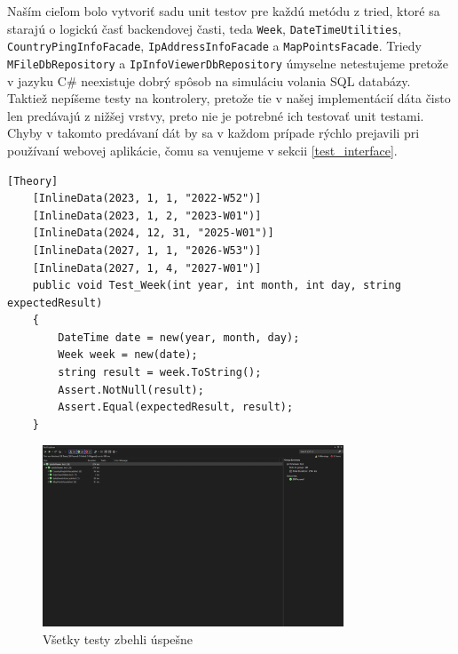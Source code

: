Naším cieľom bolo vytvoriť sadu unit testov pre každú metódu z tried, ktoré sa starajú o logickú časť backendovej časti, teda \lstinline{Week}, 
\lstinline{DateTimeUtilities}, \lstinline{CountryPingInfoFacade}, \lstinline{IpAddressInfoFacade} a \lstinline{MapPointsFacade}.
Triedy \lstinline{MFileDbRepository} a \lstinline{IpInfoViewerDbRepository} úmyselne netestujeme pretože v jazyku C\# neexistuje dobrý spôsob na simuláciu 
volania SQL databázy. Taktiež nepíšeme testy na kontrolery, pretože tie v našej implementácií dáta čisto len predávajú z nižšej vrstvy, preto nie je potrebné 
ich testovať unit testami. Chyby v takomto predávaní dát by sa v každom prípade rýchlo prejavili pri používaní webovej aplikácie, čomu sa venujeme v sekcii 
\ref{test_interface}.

\begin{lstlisting}[language={[Sharp]C},caption={Ukážka testu pre triedu Week},label=alg:test_ex]
    [Theory]
    [InlineData(2023, 1, 1, "2022-W52")]
    [InlineData(2023, 1, 2, "2023-W01")]
    [InlineData(2024, 12, 31, "2025-W01")]
    [InlineData(2027, 1, 1, "2026-W53")]
    [InlineData(2027, 1, 4, "2027-W01")]
    public void Test_Week(int year, int month, int day, string expectedResult)
    {
        DateTime date = new(year, month, day);
        Week week = new(date);
        string result = week.ToString();
        Assert.NotNull(result);
        Assert.Equal(expectedResult, result);
    }
\end{lstlisting}

\begin{figure}
    \centerline{\includegraphics[width=0.8\textwidth]{images/test}}
    \caption[Úspešné testy]{Všetky testy zbehli úspešne}
    \label{obr:test}
\end{figure}

